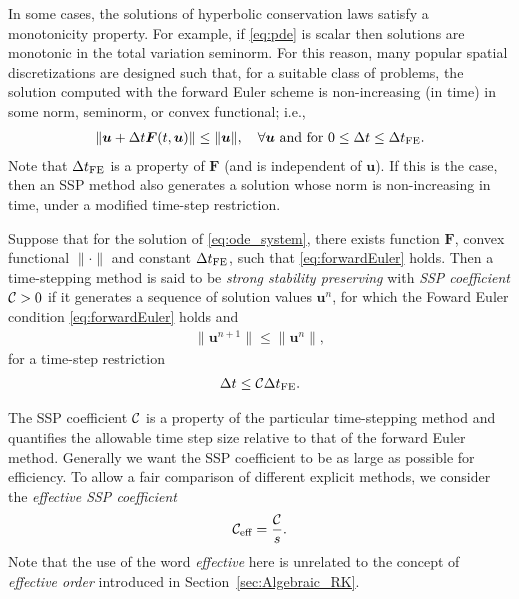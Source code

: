 In some cases, the solutions of hyperbolic conservation laws satisfy a 
monotonicity property. For example, if \eqref{eq:pde} is scalar then solutions 
are monotonic in the total variation seminorm.
For this reason, many popular spatial discretizations are designed such 
that, for a suitable class of problems, the solution %
computed with the forward Euler scheme is non-increasing (in time)
in some norm, seminorm, or convex functional; i.e.,
\begin{align}\label{eq:forwardEuler}
    \|\bm{u} + \Delta t\bm{F}(t,\bm{u})\| \le \|\bm{u}\|, \quad \forall \bm{u} \text{ and for } 0 \le \Delta t \le \Delta t_{\textnormal{FE}}.
\end{align}
Note that $\Delta t_{\textnormal{FE}}$ is a property of $\bm{F}$ (and is independent of $\bm{u}$).
If this is the case, then an SSP method also generates a solution whose norm is
non-increasing in time, under a modified time-step restriction. 
\begin{definition}
	Suppose that for the solution of \eqref{eq:ode_system}, there exists function $\bm{F}$, 
	convex functional $\|\cdot\|$ and constant $\Delta t_{\textnormal{FE}}$,
	 such that \eqref{eq:forwardEuler} holds.
	Then a time-stepping method is said to be \emph{strong stability
  	preserving} with \emph{SSP coefficient} $\mathcal{C} > 0$ if it
	generates a sequence of solution values $\bm{u}^n$, for which the 
	Foward Euler condition \eqref{eq:forwardEuler} holds and
	\begin{align*}
  		\|\bm{u}^{n+1}\| \le \|\bm{u}^n\|,
	\end{align*}
	for a time-step restriction
	\begin{align*}
		\Delta t \leq \mathcal{C} \Delta t_{\textnormal{FE}}.
	\end{align*}
\end{definition}

The SSP coefficient $\mathcal{C}$ is a property of the particular
time-stepping method and quantifies the allowable time step size relative 
to that of the forward Euler method.
Generally we want the SSP coefficient to be as large as possible for efficiency.
To allow a fair comparison of different explicit methods, we consider the 
\emph{effective SSP coefficient}
\begin{align*}
	\mathcal{C}_{\text{eff}} = \frac{\mathcal{C}}{s}.
\end{align*}
Note that the use of the word \emph{effective} here is unrelated to the 
concept of \emph{effective order} introduced in Section~\ref{sec:Algebraic_RK}.

